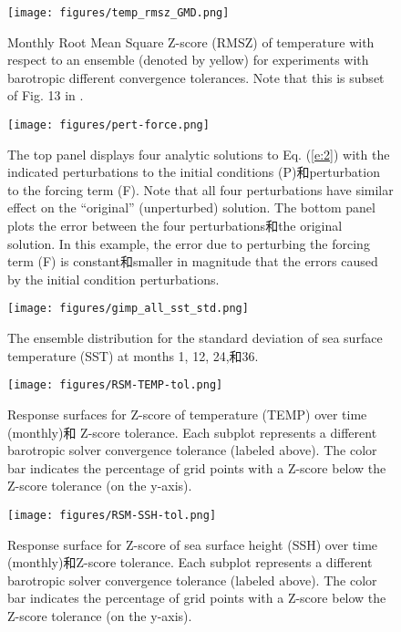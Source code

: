  \begin{figure}[h]
 \begin{center}
 \texttt{[image: figures/temp\_rmsz\_GMD.png]}
 \end{center}
 \caption {Monthly Root Mean Square Z-score (RMSZ) of temperature with respect to an ensemble (denoted by yellow) for experiments with barotropic different convergence tolerances. Note that this is subset of Fig. 13 in \cite{yong2015}. }
 \label{fig:rmsz_temp_ens}
 \end{figure} 

\begin {figure}[h]
\centering
\texttt{[image: figures/pert-force.png]}
\caption{The top panel displays four analytic solutions to Eq. (\ref{e:2}) with the indicated perturbations to the initial conditions (P)和perturbation to the forcing term (F).  Note that all four perturbations have similar effect on the ``original'' (unperturbed) solution.  The bottom panel plots the error between the four perturbations和the original solution. In this example, the error due to perturbing the forcing term (F) is constant和smaller in magnitude that the errors caused by the initial condition perturbations.}
\label {fig:1Danalytical}
\end {figure}

\begin {figure}[h]
\centering
\texttt{[image: figures/gimp\_all\_sst\_std.png]}
\caption{The ensemble distribution for the standard deviation of sea surface temperature (SST) at months 1, 12, 24,和36.}
\label{fig:SST_STD_all}
\end {figure}

\begin {figure}[h]
\centering
\texttt{[image: figures/RSM-TEMP-tol.png]}
\caption {Response surfaces for Z-score of temperature (TEMP) over time (monthly)和 Z-score tolerance.  Each subplot represents a different barotropic
solver convergence tolerance (labeled above). The color bar indicates the percentage of grid points with a Z-score below the Z-score tolerance (on the y-axis).}
\label{fig:RSM-TEMP-tol}
\end {figure}

\begin {figure}[h]
\centering
\texttt{[image: figures/RSM-SSH-tol.png]}
\caption {Response surface for Z-score of sea surface height (SSH) over time (monthly)和Z-score tolerance.  Each subplot represents a different barotropic
solver convergence tolerance (labeled above). The color bar indicates the percentage of grid points with a Z-score below the Z-score tolerance (on the y-axis).}
\label{fig:RSM-SSH-tol}
\end {figure}



